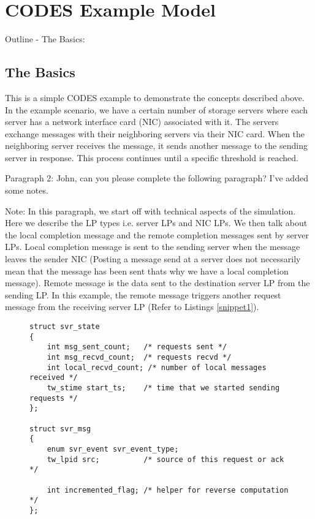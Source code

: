 \documentclass[conference,10pt,compsocconf,onecolumn]{IEEEtran}
\begin{document}
\section{CODES Example Model}
Outline
- The Basics: 
\subsection{The Basics}
This is a simple CODES example to demonstrate the concepts described above.  In
the example scenario, we have a certain number of storage servers where each
server has a network interface card (NIC) associated with it. The servers exchange
messages with their neighboring servers via their NIC card.  When the neighboring
server receives the message, it sends another message to the sending server in
response. This process continues until a specific threshold is reached.

Paragraph 2: John, can you please complete the following paragraph? I've added 
some notes.

Note: In this paragraph, we start off with technical aspects of the simulation.
Here we describe the LP types i.e. server LPs and NIC LPs.  We then talk about
the local completion message and the remote completion messages sent by server
LPs.  Local completion message is sent to the sending server when the message
leaves the sender NIC (Posting a message send at a server does not necessarily
mean that the message has been sent thats why we have a local completion
message).  Remote message is the data sent to the destination server LP from
the sending LP. In this example, the remote message triggers another request
message from the receiving server LP (Refer to Listings \ref{snippet1}). 

\begin{figure}
\begin{lstlisting}[caption=Server state and event message struct, label=snippet1]
struct svr_state
{
    int msg_sent_count;   /* requests sent */
    int msg_recvd_count;  /* requests recvd */
    int local_recvd_count; /* number of local messages received */
    tw_stime start_ts;    /* time that we started sending requests */
};

struct svr_msg
{
    enum svr_event svr_event_type;
    tw_lpid src;          /* source of this request or ack */

    int incremented_flag; /* helper for reverse computation */
};

\end{lstlisting}
\end{figure}
\end{document}
